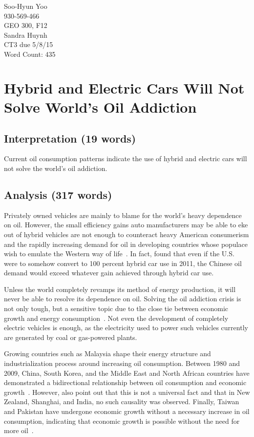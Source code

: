 \documentclass[12pt,letterpaper]{article}
\begin{document}
Soo-Hyun Yoo \\
930-569-466 \\
GEO 300, F12 \\
Sandra Huynh \\
CT3 due 5/8/15 \\
Word Count: 435

\section*{Hybrid and Electric Cars Will Not Solve World's Oil Addiction}

\subsection*{Interpretation (19 words)}   %

Current oil consumption patterns indicate the use of hybrid and electric cars
will not solve the world's oil addiction.

\subsection*{Analysis (317 words)}   %

Privately owned vehicles are mainly to blame for the world's heavy dependence
on oil. However, the small efficiency gains auto manufacturers may be able to
eke out of hybrid vehicles are not enough to counteract heavy American
consumerism and the rapidly increasing demand for oil in developing countries
whose populace wish to emulate the Western way of life~\citep[p.
310]{yetiv2011}. In fact, \citet[p. 289]{yetiv2011} found that even if the U.S.
were to somehow convert to 100 percent hybrid car use in 2011, the Chinese oil
demand would exceed whatever gain achieved through hybrid car use.

Unless the world completely revamps its method of energy production, it will
never be able to resolve its dependence on oil. Solving the oil addiction
crisis is not only tough, but a sensitive topic due to the close tie between
economic growth and energy consumption~\citep[p. 1355]{halkos2011}. Not even
the development of completely electric vehicles is enough, as the electricity
used to power such vehicles currently are generated by coal or gas-powered
plants.

Growing countries such as Malaysia shape their energy structure and
industrialization process around increasing oil consumption. Between 1980 and
2009, China, South Korea, and the Middle East and North African countries have
demonstrated a bidirectional relationship between oil consumption and economic
growth~\citep[p. 220]{park2014}. However, \citet[p. 220]{park2014} also point
out that this is not a universal fact and that in New Zealand, Shanghai, and
India, no such causality was observed. Finally, Taiwan and Pakistan have
undergone economic growth without a necessary increase in oil consumption,
indicating that economic growth is possible without the need for more
oil~\citep[p. 222]{park2014}.
\end{document}
